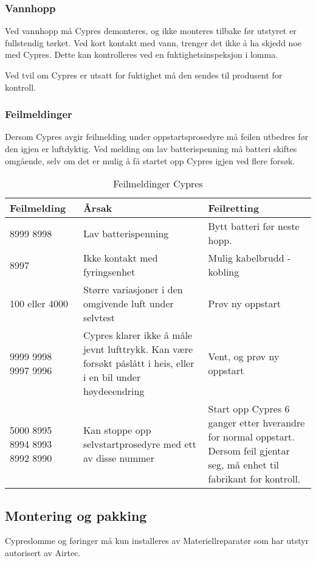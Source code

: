 \subsubsection{Vannhopp}
Ved vannhopp må Cypres demonteres, og ikke monteres tilbake før utstyret er fullstendig tørket. Ved kort kontakt med vann, trenger det ikke å ha skjedd noe med Cypres. Dette kan kontrolleres ved en fuktighetsinspeksjon i lomma.

Ved tvil om Cypres er utsatt for fuktighet må den sendes til produsent for kontroll.

\subsubsection{Feilmeldinger}
Dersom Cypres avgir feilmelding under oppstartsprosedyre må feilen utbedres før den igjen er luftdyktig. Ved melding om lav batterispenning må batteri skiftes omgående, selv om det er mulig å få startet opp Cypres igjen ved flere forsøk.

\begin{table}
	\caption{Feilmeldinger Cypres}
	\begin{tabular}{ | p{2cm} | p{5cm} | p{3cm} | }
		\hline
		Feilmelding & Årsak & Feilretting \\
		\hline
		8999 8998 & Lav batterispenning & Bytt batteri før neste hopp. \\
		\hline
		8997 & Ikke kontakt med fyringsenhet & Mulig kabelbrudd - kobling \\
		\hline
		100 eller 4000 & Større variasjoner i den omgivende luft under selvtest & Prøv ny oppstart \\
		\hline
		9999 9998 9997 9996 & Cypres klarer ikke å måle jevnt lufttrykk. Kan være forsøkt påslått i heis, eller i en bil under høydeeendring & Vent, og prøv ny oppstart \\
		\hline
		5000 8995 8994 8993 8992 8990 &Kan stoppe opp selvstartprosedyre med ett av disse nummer & Start opp Cypres 6 ganger etter hverandre for normal oppstart. Dersom feil gjentar seg, må enhet til fabrikant for kontroll.\\
		\hline
	\end{tabular}
\end{table}

\subsection{Montering og pakking}
Cypreslomme og føringer må kun installeres av Materiellreparatør som har utstyr autorisert av Airtec.

